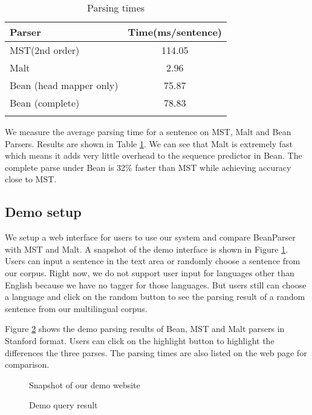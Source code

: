 \begin{table}[ht]
    \centering
    \caption{Parsing times}
    \begin{tabular}{l|c}
        \whline
        Parser & Time(ms/sentence) \\
        \hline
        MST(2nd order)  & \multicolumn{1}{c}{114.05 } \\
        Malt& \multicolumn{1}{c}{2.96 } \\
        Bean (head mapper only)& \multicolumn{1}{c}{75.87 } \\
        Bean (complete) & \multicolumn{1}{c}{78.83 } \\
        \whline
    \end{tabular}%
    \label{tab:time}%
\end{table}%

We measure the average parsing time for a sentence on MST, Malt
and Bean Parsers. Results are shown in Table \ref{tab:time}. We can see
that Malt is extremely fast which means it adds very little overhead to
the sequence predictor in Bean. The complete parse under Bean is
32\% faster than MST while achieving accuracy close to MST.


\subsection{Demo setup}
We setup a web interface for users to use our system and
compare BeanParser with MST and Malt. A snapshot of the demo interface
is shown in Figure \ref{fig:demo1}. Users can input a sentence in the
text area or randomly choose a sentence from our corpus.
Right now, we do not support user input for
languages other than English because we have no tagger for those languages.
But users still can choose a language and click on the random button to
see the parsing result of a random sentence from our multilingual corpus.

Figure \ref{fig:demo2} shows the demo parsing results of Bean, MST and Malt
parsers in Stanford format.
Users can click on the highlight button to highlight the differences
the three parses. The parsing times are also listed on the
web page for comparison.

\begin{figure}[th]
	\centering
	\caption{Snapshot of our demo website}
	\label{fig:demo1}
\end{figure}


\begin{figure}[th]
	\centering
	\caption{Demo query result}
	\label{fig:demo2}
\end{figure}






